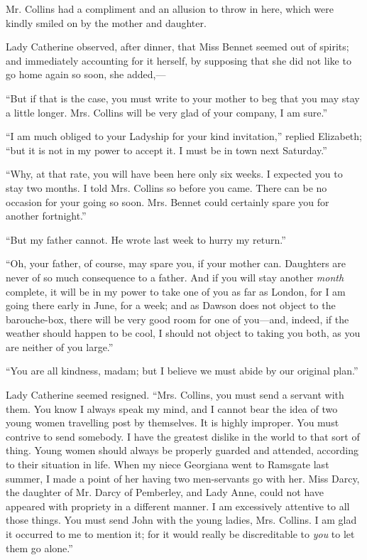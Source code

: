 Mr. Collins had a compliment and an allusion to throw in here, which were kindly smiled on by the mother and daughter.

Lady Catherine observed, after dinner, that Miss Bennet seemed out of spirits; and immediately accounting for it herself, by supposing that she did not like to go home again so soon, she added,---

``But if that is the case, you must write to your mother to beg that you may stay a little longer. Mrs. Collins will be very glad of your company, I am sure.''

``I am much obliged to your Ladyship for your kind invitation,'' replied Elizabeth; ``but it is not in my power to accept it. I must be in town next Saturday.''

``Why, at that rate, you will have been here only six weeks. I expected you to stay two months. I told Mrs. Collins so before you came. There can be no occasion for your going so soon. Mrs. Bennet could certainly spare you for another fortnight.''

``But my father cannot. He wrote last week to hurry my return.''



``Oh, your father, of course, may spare you, if your mother can. Daughters are never of so much consequence to a father. And if you will stay another \textit{month} complete, it will be in my power to take one of you as far as London, for I am going there early in June, for a week; and as Dawson does not object to the barouche-box, there will be very good room for one of you---and, indeed, if the weather should happen to be cool, I should not object to taking you both, as you are neither of you large.''

``You are all kindness, madam; but I believe we must abide by our original plan.''

Lady Catherine seemed resigned. ``Mrs. Collins, you must send a servant with them. You know I always speak my mind, and I cannot bear the idea of two young women travelling post by themselves. It is highly improper. You must contrive to send somebody. I have the greatest dislike in the world to that sort of thing. Young women should always be properly guarded and attended, according to their situation in life. When my niece Georgiana went to Ramsgate last summer, I made a point of her having two men-servants go with her. Miss Darcy, the daughter of Mr. Darcy of Pemberley, and Lady Anne, could not have appeared with propriety in a different manner. I am excessively attentive to all those things. You must send John with the young ladies, Mrs. Collins. I am glad it occurred to me to mention it; for it would really be discreditable to \textit{you} to let them go alone.''

